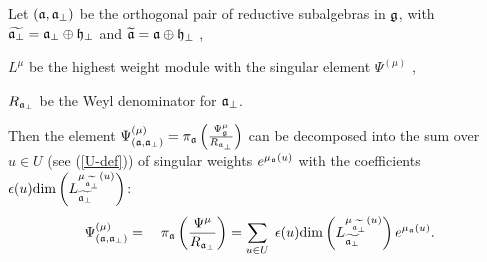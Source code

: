 \begin{lemma}
\label{lemma}
Let $\left( \mathfrak{a},\mathfrak{a}_{\bot} \right)$ be the orthogonal pair of reductive
subalgebras in $\frak{g}$, with $\widetilde{\af_{\perp }}=\af%
_{\perp }\oplus \frak{h}_{\perp }$ and $\widetilde{\mathfrak{a}}=\mathfrak{a}\oplus
\frak{h}_{\perp }$ ,

$L^{\mu }$ be the highest weight module with the singular element
$\Psi ^{\left(\mu \right)}$ ,

$R_{\mathfrak{a}_{\perp }}$ be the Weyl denominator for $\mathfrak{a}_{\perp }$.

Then the element $\Psi ^{\left( \mu \right) }_{\left(  \mathfrak{a}, \mathfrak{a}_{\bot} \right)}
=\pi _{\mathfrak{a}}\left( \frac{\Psi _{\frak{g}}^{\mu }}{R_{\mathfrak{a}_{\perp }}}\right) $
can be decomposed into the sum over $u\in U$ (see (\ref{U-def})) of
singular weights $e^{\mu _{\mathfrak{a}}\left( u\right) }$ with the
coefficients $\epsilon (u)\mathrm{\dim }\left( L_{\widetilde{\mathfrak{a}_{\perp
}}}^{\mu _{\widetilde{\mathfrak{a}_{\perp }}}\left( u\right) }\right) $:
\begin{equation}
\Psi ^{\left( \mu \right) }_{\left(  \af, \afb \right)}=\quad \pi _{\af}\left( \frac{\Psi^{\mu }}{R_{\af%
_{\perp }}}\right) =\sum_{u\in U}\;\epsilon (u)\mathrm{\dim }
\left( L_{\widetilde{\af_{\perp }}}^{\mu _{%
\widetilde{\af_{\perp }}}\left( u\right) }\right) e^{\mu _{\af}\left( u \right) }.
\end{equation}
\end{lemma}

